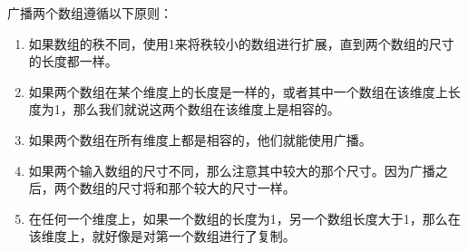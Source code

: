 \begin{frame}



广播两个数组遵循以下原则：
\begin{enumerate}
\item 如果数组的秩不同，使用1来将秩较小的数组进行扩展，直到两个数组的尺寸的长度都一样。
\item 如果两个数组在某个维度上的长度是一样的，或者其中一个数组在该维度上长度为1，那么我们就说这两个数组在该维度上是相容的。
\item 如果两个数组在所有维度上都是相容的，他们就能使用广播。
\item 如果两个输入数组的尺寸不同，那么注意其中较大的那个尺寸。因为广播之后，两个数组的尺寸将和那个较大的尺寸一样。
\item 在任何一个维度上，如果一个数组的长度为1，另一个数组长度大于1，那么在该维度上，就好像是对第一个数组进行了复制。
\end{enumerate}

\end{frame}

